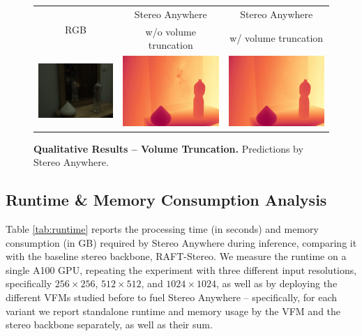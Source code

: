 \documentclass[10pt,twocolumn,letterpaper]{article}
\newcommand{\method}[0]{Stereo Anywhere\xspace}
\begin{document}
\begin{figure}[h]
    \centering
    \renewcommand{\tabcolsep}{1pt}
    \begin{tabular}{ccc}

    \multirow{2}{*}{\small RGB} & \small \method & \small \method \\
    & \small w/o volume truncation & \small w/ volume truncation \\
    \includegraphics[width=0.3\linewidth]{imgs/booster/rgb/19.jpg} &
    \includegraphics[width=0.3\linewidth]{imgs/mirror_without_truncation.jpg} &
    \includegraphics[width=0.3\linewidth]{imgs/mirror_with_truncation.jpg} \\

    \end{tabular}\vspace{-0.3cm}
    \caption{\textbf{Qualitative Results -- Volume Truncation.} Predictions by \method{}.}
    \label{fig:truncation}\vspace{-0.3cm}
\end{figure}

\subsection{Runtime \& Memory Consumption Analysis}
\label{subsec:runtime}
Table \ref{tab:runtime} reports the processing time (in seconds) and memory consumption (in GB) required by \method during inference, comparing it with the baseline stereo backbone, RAFT-Stereo.
We measure the runtime on a single A100 GPU, repeating the experiment with three different input resolutions, specifically $256\times256$, $512\times512$, and $1024\times1024$, as well as by deploying the different VFMs studied before to fuel \method{} -- specifically, for each variant we report standalone runtime and memory usage by the VFM and the stereo backbone separately, as well as their sum.
\end{document}
